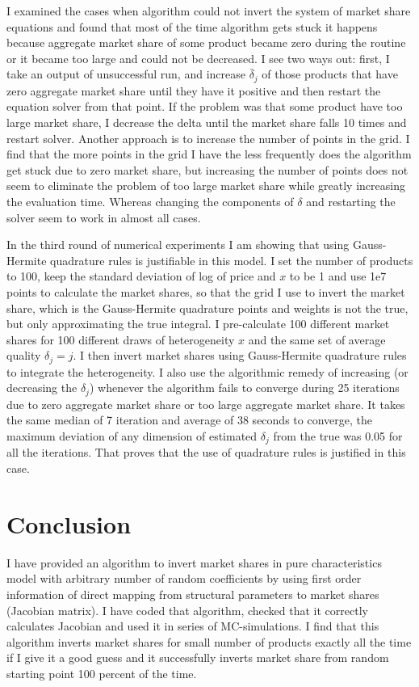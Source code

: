 \documentclass[12pt,letterpaper]{article}
\begin{document}
	I examined the cases when algorithm could not invert the system of market share equations and found that most of the time algorithm gets stuck it happens because aggregate market share of some product became zero during the routine or it became too large and could not be decreased. I see two ways out: first, I take an output of unsuccessful run, and  increase $\bar\delta_j$ of those products that have zero aggregate market share until they have it positive and then restart the equation solver from that point. If the problem was that some product have too large market share, I decrease the delta until the market share falls 10 times and restart solver. Another approach is to increase the number of points in the grid. I find that the more points in the grid I have the less frequently does the algorithm get stuck due to zero market share, but increasing the number of points does not seem to  eliminate the problem of too large market share while greatly increasing the evaluation time. Whereas changing the components of $\delta$ and restarting the solver seem to work in almost all cases.
	
	In the third round of numerical experiments I am showing that using Gauss-Hermite quadrature rules is justifiable in this model. I set the number of products to 100, keep the standard deviation of log of price and $x$ to be 1 and use 1e7 points to calculate the market shares, so that the grid I use to invert the market share, which is the Gauss-Hermite quadrature points and weights is not the true, but only approximating the true integral. I pre-calculate 100 different market shares for 100 different draws of heterogeneity $x$ and the same set of average quality $\delta_j = j$. I then invert market shares using Gauss-Hermite quadrature rules to integrate the heterogeneity. I also use the algorithmic remedy of increasing (or decreasing the $\delta_j$) whenever the algorithm fails to converge during 25 iterations due to zero aggregate market share or too large aggregate market share. It takes the same median of 7 iteration and average of 38 seconds to converge, the maximum deviation of any dimension of estimated $\delta_j$ from the true was 0.05 for all the iterations. That proves that the use of quadrature rules is justified in this case.
	
	\section{Conclusion}
	
	I have provided an algorithm to invert market shares in pure characteristics model with arbitrary number of random coefficients by using first order information of direct mapping from structural parameters to market shares (Jacobian matrix). I have coded that algorithm, checked that it correctly calculates Jacobian and used it in series of MC-simulations. I find that this algorithm inverts market shares for small number of products exactly all the time if I give it a good guess and it successfully inverts market share from random starting point 100 percent of the time. 
	
\end{document}
